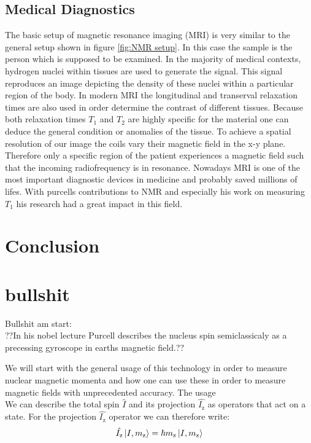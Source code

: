 \documentclass{article}
\begin{document}
\subsection{Medical Diagnostics}
The basic setup of magnetic resonance imaging (MRI) is very similar to the general setup shown in figure \ref{fig:NMR setup}. In this case the sample is the person which is supposed to be examined. In the majority of medical contexts, hydrogen nuclei within tissues are used to generate the signal. This signal reproduces an image depicting the density of these nuclei within a particular region of the body. In modern MRI the longitudinal and transerval relaxation times are also used in order determine the contrast of different tissues. Because both relaxation times $T_1$ and $T_2$ are highly specific for the material one can deduce the general condition or anomalies of the tissue. To achieve a spatial resolution of our image the coils vary their magnetic field in the x-y plane. Therefore only a specific region of the patient experiences a magnetic field such that the incoming radiofrequency is in resonance. Nowadays MRI is one of the most important diagnostic devices in medicine and probably saved millions of lifes. With purcells contributions to NMR and especially his work on measuring $T_1$ his research had a great impact in this field.

\section{Conclusion}





\section{bullshit}

Bullshit am start:\\

??In his nobel lecture Purcell describes the nucleus spin semiclassicaly as a precessing gyroscope in earths magnetic field.??


We will start with the general usage of this technology in order to measure nuclear magnetic momenta and how one can use these in order to measure magnetic fields with unprecedented accuracy. The usage\\

We can describe the total spin $\hat{I}$ and its projection $\hat{I_{\mathrm{z}}}$ as operators that act on a state. For the projection $\hat{I_{\mathrm{z}}}$ operator we can therefore write:
\begin{equation}
   \hat{I_{\mathrm{z}}} \ket{I,m_{\mathrm{z}}}=\hbar m_{\mathrm{z}}\ket{I,m_{\mathrm{z}}}
\end{equation}
\end{document}
